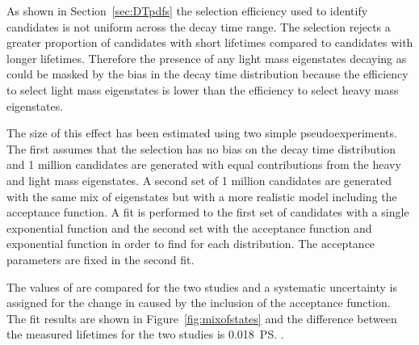 As shown in Section~\ref{sec:DTpdfs} the selection efficiency used to identify \bsmumu candidates is not uniform across the decay time range. The selection rejects a greater proportion of candidates with short lifetimes compared to candidates with longer lifetimes. Therefore the presence of any light \bs mass eigenstates decaying as \bsmumu could be masked by the bias in the decay time distribution because the efficiency to select light \bs mass eigenstates is lower than the efficiency to select heavy \bs mass eigenstates.

The size of this effect has been estimated using two simple pseudoexperiments. The first assumes that the selection has no bias on the decay time distribution and 1 million candidates are generated with equal contributions from the heavy and light \bs mass eigenstates.%
 A second set of 1 million candidates are generated with the same mix of eigenstates but with a more realistic model including the \bsmumu acceptance function. A fit is performed to the first set of candidates with a single exponential function and the second set with the acceptance function and exponential function in order to find \tmumu for each distribution. The acceptance parameters are fixed in the second fit.

The values of \tmumu are compared for the two studies and a systematic uncertainty is assigned for the change in \tmumu caused by the inclusion of the acceptance function. The fit results are shown in Figure~\ref{fig:mixofstates} and the difference between the measured lifetimes for the two studies is 0.018~\ps.

